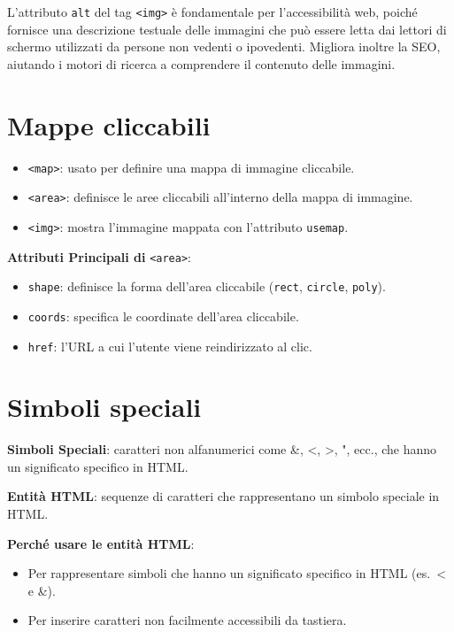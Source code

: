 L'attributo \texttt{alt} del tag \texttt{<img>} è fondamentale per l'accessibilità web, poiché fornisce una descrizione testuale delle immagini che può essere letta dai lettori di schermo utilizzati da persone non vedenti o ipovedenti. Migliora inoltre la SEO, aiutando i motori di ricerca a comprendere il contenuto delle immagini.

\section{Mappe cliccabili}

\begin{itemize}
    \item \texttt{<map>}: usato per definire una mappa di immagine cliccabile.
    \item \texttt{<area>}: definisce le aree cliccabili all'interno della mappa di immagine.
    \item \texttt{<img>}: mostra l'immagine mappata con l'attributo \texttt{usemap}.
\end{itemize}

\textbf{Attributi Principali di} \texttt{<area>}:
\begin{itemize}
    \item \texttt{shape}: definisce la forma dell'area cliccabile (\texttt{rect}, \texttt{circle}, \texttt{poly}).
    \item \texttt{coords}: specifica le coordinate dell'area cliccabile.
    \item \texttt{href}: l'URL a cui l'utente viene reindirizzato al clic.
\end{itemize}

\section{Simboli speciali}

\textbf{Simboli Speciali}: caratteri non alfanumerici come \&, <, >, ", ecc., che hanno un significato specifico in HTML.

\textbf{Entità HTML}: sequenze di caratteri che rappresentano un simbolo speciale in HTML.

\textbf{Perché usare le entità HTML}:
\begin{itemize}
    \item Per rappresentare simboli che hanno un significato specifico in HTML (es.\ < e \&).
    \item Per inserire caratteri non facilmente accessibili da tastiera.
\end{itemize}

